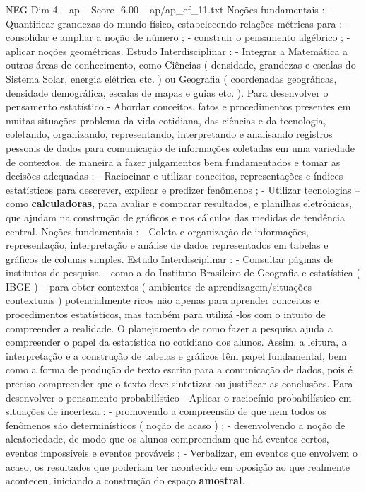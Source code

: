 \begin{textsample}{NEG Dim 4 – ap – Score -6.00 – ap/ap\_ef\_11.txt}
Noções fundamentais : - Quantificar grandezas do mundo físico, estabelecendo relações métricas para : - consolidar e ampliar a noção de número ; - construir o pensamento algébrico ; - aplicar noções geométricas.
Estudo Interdisciplinar : - Integrar a Matemática a outras áreas de conhecimento, como Ciências ( densidade, grandezas e escalas do Sistema Solar, energia elétrica etc. ) ou Geografia ( coordenadas geográficas, densidade demográfica, escalas de mapas e guias etc. ).
Para desenvolver o pensamento estatístico - Abordar conceitos, fatos e procedimentos presentes em muitas situações-problema da vida cotidiana, das ciências e da tecnologia, coletando, organizando, representando, interpretando e analisando registros pessoais de dados para comunicação de informações coletadas em uma variedade de contextos, de maneira a fazer julgamentos bem fundamentados e tomar as decisões adequadas ; - Raciocinar e utilizar conceitos, representações e índices estatísticos para descrever, explicar e predizer fenômenos ; - Utilizar tecnologias – como \textbf{calculadoras}, para avaliar e comparar resultados, e planilhas eletrônicas, que ajudam na construção de gráficos e nos cálculos das medidas de tendência central.
Noções fundamentais : - Coleta e organização de informações, representação, interpretação e análise de dados representados em tabelas e gráficos de colunas simples.
Estudo Interdisciplinar : - Consultar páginas de institutos de pesquisa – como a do Instituto Brasileiro de Geografia e estatística ( IBGE ) – para obter contextos ( ambientes de aprendizagem/situações contextuais ) potencialmente ricos não apenas para aprender conceitos e procedimentos estatísticos, mas também para utilizá -los com o intuito de compreender a realidade.
O planejamento de como fazer a pesquisa ajuda a compreender o papel da estatística no cotidiano dos alunos.
Assim, a leitura, a interpretação e a construção de tabelas e gráficos têm papel fundamental, bem como a forma de produção de texto escrito para a comunicação de dados, pois é preciso compreender que o texto deve sintetizar ou justificar as conclusões.
Para desenvolver o pensamento probabilístico - Aplicar o raciocínio probabilístico em situações de incerteza : - promovendo a compreensão de que nem todos os fenômenos são determinísticos ( noção de acaso ) ; - desenvolvendo a noção de aleatoriedade, de modo que os alunos compreendam que há eventos certos, eventos impossíveis e eventos prováveis ; - Verbalizar, em eventos que envolvem o acaso, os resultados que poderiam ter acontecido em oposição ao que realmente aconteceu, iniciando a construção do espaço \textbf{amostral}.

\end{textsample}
